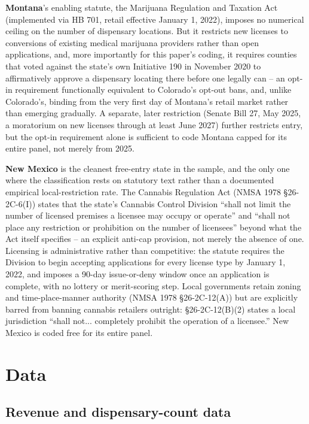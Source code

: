 \documentclass[12pt]{article}
\begin{document}
\textbf{Montana}'s enabling statute, the Marijuana Regulation and Taxation Act (implemented via HB 701, retail
effective January 1, 2022), imposes no numerical ceiling on the number of dispensary locations. But it
restricts new licenses to conversions of existing medical marijuana providers rather than open applications,
and, more importantly for this paper's coding, it requires counties that voted against the state's own
Initiative 190 in November 2020 to affirmatively approve a dispensary locating there before one legally can --
an opt-in requirement functionally equivalent to Colorado's opt-out bans, and, unlike Colorado's, binding from
the very first day of Montana's retail market rather than emerging gradually. A separate, later restriction
(Senate Bill 27, May 2025, a moratorium on new licenses through at least June 2027) further restricts entry, but
the opt-in requirement alone is sufficient to code Montana capped for its entire panel, not merely from 2025.

\textbf{New Mexico} is the cleanest free-entry state in the sample, and the only one where the classification
rests on statutory text rather than a documented empirical local-restriction rate. The Cannabis Regulation Act
(NMSA 1978 \S 26-2C-6(I)) states that the state's Cannabis Control Division ``shall not limit the number of
licensed premises a licensee may occupy or operate'' and ``shall not place any restriction or prohibition on
the number of licensees'' beyond what the Act itself specifies -- an explicit anti-cap provision, not merely
the absence of one. Licensing is administrative rather than competitive: the statute requires the Division to
begin accepting applications for every license type by January 1, 2022, and imposes a 90-day issue-or-deny
window once an application is complete, with no lottery or merit-scoring step. Local governments retain zoning
and time-place-manner authority (NMSA 1978 \S 26-2C-12(A)) but are explicitly barred from banning cannabis
retailers outright: \S 26-2C-12(B)(2) states a local jurisdiction ``shall not... completely prohibit the
operation of a licensee.'' New Mexico is coded free for its entire panel.

\section{Data}
\label{sec:data}

\subsection{Revenue and dispensary-count data}
\end{document}
